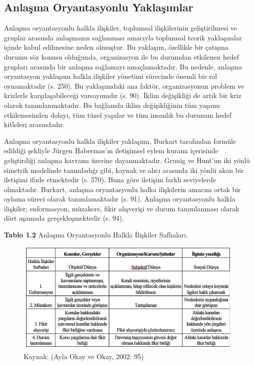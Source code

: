 \documentclass[
]{book}
\begin{document}
\hypertarget{anlaux15fma-oryantasyonlu-yaklaux15fux131mlar}{%
\subsection{Anlaşma Oryantasyonlu Yaklaşımlar}\label{anlaux15fma-oryantasyonlu-yaklaux15fux131mlar}}

Anlaşma oryantasyonlu halkla ilişkiler, toplumsal ilişkilerinin geliştirilmesi ve gruplar arasında anlaşmanın sağlanması amacıyla toplumsal teorik yaklaşımlar içinde kabul edilmesine neden olmuştur. Bu yaklaşım, özellikle bir çatışma durumu söz konusu olduğunda, organizasyon ile bu durumdan etkilenen hedef grupları arasında bir anlaşma sağlamayı amaçlamaktadır. Bu nedenle, anlaşma oryantasyon yaklaşımı halkla ilişkiler yönetimi sürecinde önemli bir rol oynamaktadır (s. 250). \citep{burkart2007} Bu yaklaşımdaki ana faktör, organizasyonun problem ve krizlerle karşılaşabileceği varsayımıdır (s. 90). \citep{ayla2002halkla} İklim değişikliği de artık bir kriz olarak tanımlanmaktadır. Bu bağlamda iklim değişikliğinin tüm yaşamı etkilemesinden dolayı, tüm tüzel yapılar ve tüm insanlık bu durumun hedef kitleleri arasındadır.

Anlaşma oryantasyonlu halkla ilişkiler yaklaşımı, Burkart tarafından formüle edildiği şekliyle Jürgen Habermas'ın iletişimsel eylem kuramı içerisinde geliştirdiği anlaşma kavramı üzerine dayanmaktadır. Grunig ve Hunt'un iki yönlü simetrik modelinde tanımladığı gibi, kaynak ve alıcı arasında iki yönlü akan bir iletişimi ifade etmektedir (s. 570). \citep{ralphtench2017exploring} Buna göre iletişim farklı seviyelerde olmaktadır. Burkart, anlaşma oryantasyonlu halka ilişkilerin amacını ortak bir oylama süreci olarak tanımlamaktadır (s. 91).\citep{ayla2002halkla} Anlaşma oryantasyonlu halkla ilişkiler; enformasyon, müzakere, fikir alışverişi ve durum tanımlanması olarak dört aşamada gerçekleşmektedir (s. 94). \citep{ayla2002halkla}

\textbf{Tablo 1.2} Anlaşma Oryantasyonlu Halkla İlişkiler Safhaları.

\begin{figure}
\includegraphics[width=0.95\linewidth,height=0.95\textheight]{tablolar-sekiller/tablo-1.2} \caption{Kaynak: (Ayla Okay ve Okay, 2002: 95)}\label{fig:unnamed-chunk-1}
\end{figure}
\end{document}

